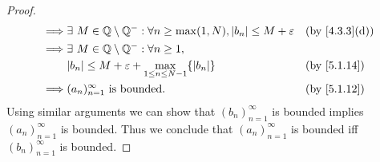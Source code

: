 \begin{proof}
\begin{align*}
    \implies & \exists\ M \in \Q \setminus \Q^- : \forall n \geq \max(1, N), \abs{b_n} \leq M + \varepsilon &  & \text{(by \cref{4.3.3}(d))}    \\
    \implies & \exists\ M \in \Q \setminus \Q^- : \forall n \geq 1,                                                                             \\
             & \abs{b_n} \leq M + \varepsilon + \max_{1 \leq n \leq N - 1}\{\abs{b_n}\}                     &  & \text{(by \cref{5.1.14})}      \\
    \implies & (a_n)_{n = 1}^\infty \text{ is bounded}.                                                     &  & \text{(by \cref{5.1.12})}
  \end{align*}
  Using similar arguments we can show that \((b_n)_{n = 1}^\infty\) is bounded implies \((a_n)_{n = 1}^\infty\) is bounded.
  Thus we conclude that \((a_n)_{n = 1}^\infty\) is bounded iff \((b_n)_{n = 1}^\infty\) is bounded.
\end{proof}